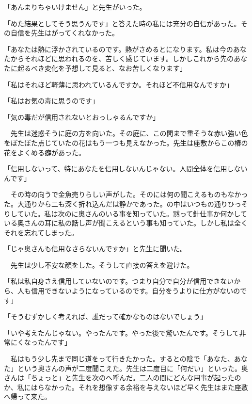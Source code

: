 \documentclass[a4j,onecolumn]{tarticle}
\begin{document}
「あんまりちゃいけません」と先生がいった。\hbox{}\par{}
「めた結果としてそう思うんです」と答えた時の私には充分の自信があった。\hbox{}その自信を先生はがってくれなかった。\hbox{}\par{}
「あなたは熱に浮かされているのです。\hbox{}熱がさめるとになります。\hbox{}私は今のあなたからそれほどに思われるのを、\hbox{}苦しく感じています。\hbox{}しかしこれから先のあなたに起るべき変化を予想して見ると、\hbox{}なお苦しくなります」\par{}
「私はそれほど軽薄に思われているんですか。\hbox{}それほど不信用なんですか」\par{}
「私はお気の毒に思うのです」\par{}
「気の毒だが信用されないとおっしゃるんですか」\par{}
　先生は迷惑そうに庭の方を向いた。\hbox{}その庭に、\hbox{}この間まで重そうな赤い強い色をぽたぽた点じていたの花はもう一つも見えなかった。\hbox{}先生は座敷からこの椿の花をよくめる癖があった。\hbox{}\par{}
「信用しないって、\hbox{}特にあなたを信用しないんじゃない。\hbox{}人間全体を信用しないんです」\par{}
　その時の向うで金魚売りらしい声がした。\hbox{}そのには何の聞こえるものもなかった。\hbox{}大通りから二も深く折れ込んだは静かであった。\hbox{}の中はいつもの通りひっそりしていた。\hbox{}私は次のに奥さんのいる事を知っていた。\hbox{}黙って針仕事か何かしている奥さんの耳に私の話し声が聞こえるという事も知っていた。\hbox{}しかし私は全くそれを忘れてしまった。\hbox{}\par{}
「じゃ奥さんも信用なさらないんですか」と先生に聞いた。\hbox{}\par{}
　先生は少し不安な顔をした。\hbox{}そうして直接の答えを避けた。\hbox{}\par{}
「私は私自身さえ信用していないのです。\hbox{}つまり自分で自分が信用できないから、\hbox{}人も信用できないようになっているのです。\hbox{}自分をうよりに仕方がないのです」\par{}
「そうむずかしく考えれば、\hbox{}誰だって確かなものはないでしょう」\par{}
「いや考えたんじゃない。\hbox{}やったんです。\hbox{}やった後で驚いたんです。\hbox{}そうして非常にくなったんです」\par{}
　私はもう少し先まで同じ道をって行きたかった。\hbox{}するとの陰で「あなた、\hbox{}あなた」という奥さんの声が二度聞こえた。\hbox{}先生は二度目に「何だい」といった。\hbox{}奥さんは「ちょっと」と先生を次のへ呼んだ。\hbox{}二人の間にどんな用事が起ったのか、\hbox{}私にはらなかった。\hbox{}それを想像する余裕を与えないほど早く先生はまた座敷へ帰って来た。\hbox{}\par{}
\end{document}
